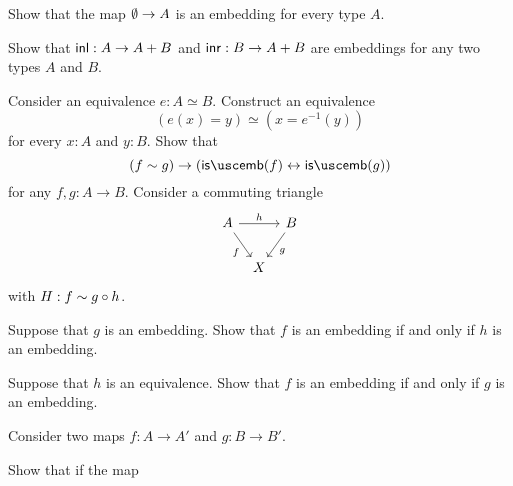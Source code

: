 \begin{exercises}
  \exercise
  \begin{subexenum}
  \item \label{ex:is-emb-empty}Show that the map $\emptyset\to A$ is an embedding for every type $A$.
  \item \label{ex:is-emb-inl-inr}Show that ${\mathsf{inl}}:A\to A+B$ and ${\mathsf{inr}}:B\to A+B$ are embeddings for any two types $A$ and $B$.
  \end{subexenum}
  \exercise Consider an equivalence $e:A\simeq B$. Construct an equivalence
  \begin{equation*}
    (e(x)=y)\simeq(x=e^{-1}(y))
  \end{equation*}
  for every $x:A$ and $y:B$.
  \exercise Show that
  \begin{equation*}
    (f\htpy g)\to (\isemb(f)\leftrightarrow\isemb(g))
  \end{equation*}
  for any $f,g:A\to B$.
  \exercise \label{ex:emb_triangle}Consider a commuting triangle
  \begin{equation*}
    \begin{tikzcd}[column sep=tiny]
      A \arrow[rr,"h"] \arrow[dr,swap,"f"] & & B \arrow[dl,"g"] \\
      & X
    \end{tikzcd}
  \end{equation*}
  with $H:f\sim g\circ h$. 
  \begin{subexenum}
  \item Suppose that $g$ is an embedding. Show that $f$ is an embedding if and only if $h$ is an embedding.
  \item Suppose that $h$ is an equivalence. Show that $f$ is an embedding if and only if $g$ is an embedding.
  \end{subexenum}
  \exercise \label{ex:is-equiv-is-equiv-functor-coprod}Consider two maps $f:A\to A'$ and $g:B \to B'$.
  \begin{subexenum}
  \item Show that if the map

\end{subexenum}
\end{exercises}
